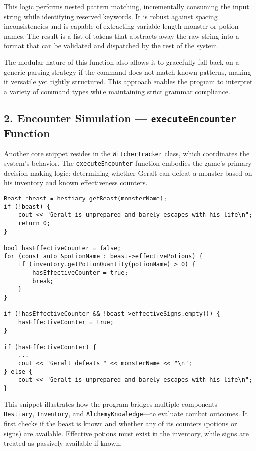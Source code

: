 \documentclass{article}
\begin{document}
This logic performs nested pattern matching, incrementally consuming the input string while identifying reserved keywords. It is robust against spacing inconsistencies and is capable of extracting variable-length monster or potion names. The result is a list of tokens that abstracts away the raw string into a format that can be validated and dispatched by the rest of the system.

The modular nature of this function also allows it to gracefully fall back on a generic parsing strategy if the command does not match known patterns, making it versatile yet tightly structured. This approach enables the program to interpret a variety of command types while maintaining strict grammar compliance.

\subsection*{2. Encounter Simulation — \texttt{executeEncounter} Function}

Another core snippet resides in the \texttt{WitcherTracker} class, which coordinates the system's behavior. The \texttt{executeEncounter} function embodies the game’s primary decision-making logic: determining whether Geralt can defeat a monster based on his inventory and known effectiveness counters.

\begin{verbatim}
Beast *beast = bestiary.getBeast(monsterName);
if (!beast) {
    cout << "Geralt is unprepared and barely escapes with his life\n";
    return 0;
}

bool hasEffectiveCounter = false;
for (const auto &potionName : beast->effectivePotions) {
    if (inventory.getPotionQuantity(potionName) > 0) {
        hasEffectiveCounter = true;
        break;
    }
}

if (!hasEffectiveCounter && !beast->effectiveSigns.empty()) {
    hasEffectiveCounter = true;
}

if (hasEffectiveCounter) {
    ...
    cout << "Geralt defeats " << monsterName << "\n";
} else {
    cout << "Geralt is unprepared and barely escapes with his life\n";
}
\end{verbatim}

This snippet illustrates how the program bridges multiple components—\texttt{Bestiary}, \texttt{Inventory}, and \texttt{AlchemyKnowledge}—to evaluate combat outcomes. It first checks if the beast is known and whether any of its counters (potions or signs) are available. Effective potions must exist in the inventory, while signs are treated as passively available if known.
\end{document}
